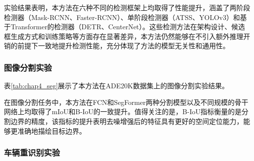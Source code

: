 实验结果表明，本方法在六种不同的检测框架上均取得了性能提升，涵盖了两阶段检测器（Mask-RCNN、Faster-RCNN）、单阶段检测器（ATSS、YOLOv3）和基于Transformer的检测器（DETR、CenterNet）。这些检测方法在架构设计、候选框生成方式和训练策略等方面存在显著差异，本方法仍然能够在不引入额外推理开销的前提下一致地提升检测性能，充分体现了方法的模型无关性和通用性。

\subsubsection{图像分割实验}

表\ref{tab:chap4_seg}展示了本方法在ADE20K数据集上的图像分割实验结果。

\begin{table}[htbp]
\centering
\caption{本章方法在图像分割任务上的实验结果\protect\\[-2pt]{\rm Table\;\thetable\quad Experimental results on image segmentation tasks}}\label{tab:chap4_seg}
\vspace{0.2cm}
\renewcommand{\arraystretch}{1.2}
\end{table}

在图像分割任务中，本方法在FCN和SegFormer两种分割模型以及不同规模的骨干网络上均取得了mIoU和B-IoU的一致提升。值得关注的是，B-IoU指标衡量的是分割边界的精度，该指标的提升表明去噪增强后的特征具有更好的空间定位能力，能够更准确地描绘目标边界。

\subsubsection{车辆重识别实验}

